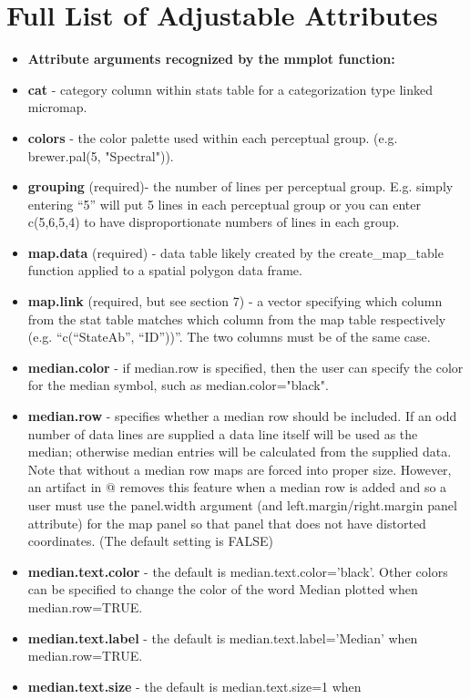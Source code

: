 \documentclass{article}
\begin{document}
\section{Full List of Adjustable Attributes}
\begin{itemize}
\item  \textbf{Attribute arguments recognized by the mmplot function:}
\item  \textbf{cat} - category column within stats table for a categorization type linked micromap.
\item  \textbf{colors} - the color palette used within each perceptual group. (e.g. brewer.pal(5, "Spectral")).
\item  \textbf{grouping} (required)- the number of lines per perceptual group. E.g. simply entering ``5'' will put 5 lines in each
perceptual group or you can enter c(5,6,5,4) to have disproportionate numbers of lines in each group.
\item  \textbf{map.data} (required) - data table likely created by the create\_map\_table function applied to a spatial polygon data frame.
\item  \textbf{map.link} (required, but see section 7) - a vector specifying which column from the stat table matches which column from the map table respectively (e.g. ``c(``StateAb'', ``ID''))''. The two columns must be of the same case.
\item \textbf{median.color} - if median.row is specified, then the user can specify the color for the median symbol, such as median.color="black".
\item  \textbf{median.row} - specifies whether a median row should be included. If an odd number of data lines are supplied a data line itself will be used as the median; otherwise median entries will be calculated from the supplied data. Note that without a median row maps are forced into proper size. However, an artifact in @ removes this feature when a median row is added and so a user must use the panel.width argument (and left.margin/right.margin panel attribute) for the map panel so that panel that does not have distorted coordinates. (The default setting is FALSE)
\item \textbf{median.text.color} - the default is median.text.color='black'.  Other colors can be specified to change the color of the word Median plotted when median.row=TRUE.
\item \textbf{median.text.label} - the default is median.text.label='Median' when median.row=TRUE.
\item \textbf{median.text.size} - the default is median.text.size=1 when

\end{itemize}
\end{document}
